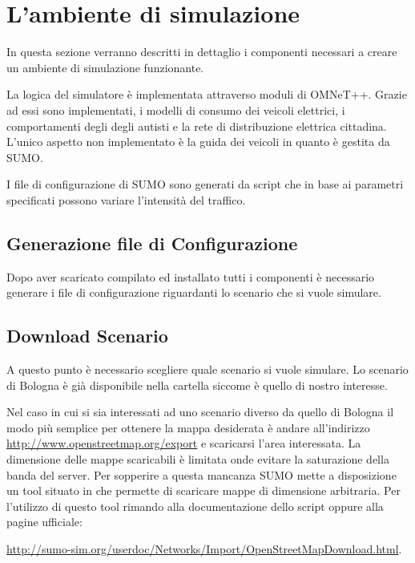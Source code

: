 \section{L'ambiente di simulazione}

In questa sezione verranno descritti in dettaglio i componenti necessari a creare un ambiente di simulazione funzionante.

La logica del simulatore è implementata attraverso moduli di OMNeT++. Grazie ad essi sono implementati, i modelli di consumo dei veicoli elettrici, i comportamenti degli degli autisti e la rete di distribuzione elettrica cittadina. L'unico aspetto non implementato è la guida dei veicoli in quanto è gestita da SUMO.

I file di configurazione di SUMO sono generati da script che in base ai parametri specificati possono variare l'intensità del traffico.


\subsection{Generazione file di Configurazione}

Dopo aver scaricato compilato ed installato tutti i componenti è necessario generare i file di configurazione riguardanti lo scenario che si vuole simulare. 

\subsection{Download Scenario}

A questo punto è necessario scegliere quale scenario si vuole simulare. Lo scenario di Bologna è già disponibile nella cartella  siccome è quello di nostro interesse.

Nel caso in cui si sia interessati ad uno scenario diverso da quello di Bologna il modo più semplice per ottenere la mappa desiderata è andare all'indirizzo \url{http://www.openstreetmap.org/export} e scaricarsi l'area interessata. La dimensione delle mappe scaricabili è limitata onde evitare la saturazione della banda del server. Per sopperire a questa mancanza SUMO mette a disposizione un tool situato in  che permette di scaricare mappe di dimensione arbitraria. Per l'utilizzo di questo tool rimando alla documentazione dello script oppure alla pagine ufficiale:

\url{http://sumo-sim.org/userdoc/Networks/Import/OpenStreetMapDownload.html}.


